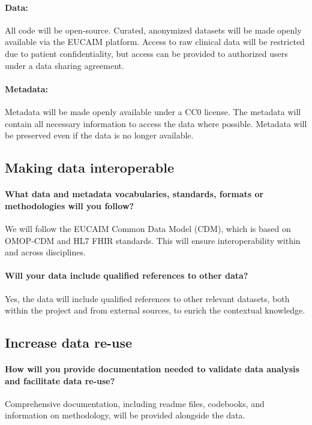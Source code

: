 \documentclass[11pt, a4paper]{article}
\begin{document}
\paragraph{Data:}
All code will be open-source. Curated, anonymized datasets will be made openly available via the EUCAIM platform. Access to raw clinical data will be restricted due to patient confidentiality, but access can be provided to authorized users under a data sharing agreement.

\paragraph{Metadata:}
Metadata will be made openly available under a CC0 license. The metadata will contain all necessary information to access the data where possible. Metadata will be preserved even if the data is no longer available.

\subsection*{Making data interoperable}

\paragraph{What data and metadata vocabularies, standards, formats or methodologies will you follow?}
We will follow the EUCAIM Common Data Model (CDM), which is based on OMOP-CDM and HL7 FHIR standards. This will ensure interoperability within and across disciplines.

\paragraph{Will your data include qualified references to other data?}
Yes, the data will include qualified references to other relevant datasets, both within the project and from external sources, to enrich the contextual knowledge.

\subsection*{Increase data re-use}

\paragraph{How will you provide documentation needed to validate data analysis and facilitate data re-use?}
Comprehensive documentation, including readme files, codebooks, and information on methodology, will be provided alongside the data.
\end{document}
